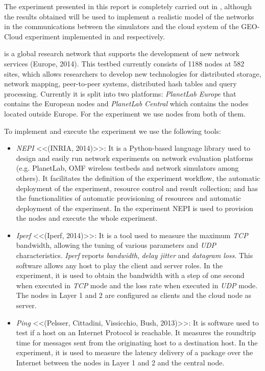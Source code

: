 The experiment presented in this report is completely carried out in \pl, although the results obtained will be used to implement a realistic model of the networks in the communications between the simulators and the cloud system of the GEO-Cloud experiment implemented in \vw and \bonfire respectively. 

\pl is a global research network that supports the development of new network
services (Europe, 2014). This testbed currently consists of 1188 nodes at 582
sites, which allows researchers to develop new technologies for distributed
storage, network mapping, peer-to-peer systems, distributed hash tables and
query processing. Currently it is split into two platforms: \emph{PlanetLab
  Europe} that contains the European nodes and \emph{PlanetLab Central} which
contains the nodes located outside Europe. 
For the experiment we use nodes from both of them. 

To implement and execute the experiment we use the following tools: 
\begin{itemize}
\item \emph{NEPI} <<(INRIA, 2014)>>: It is a Python-based language library used to design and easily run network experiments on network evaluation platforms (e.g. PlanetLab, OMF wireless testbeds and network simulators among others). It facilitates the definition of the experiment workflow, the automatic deployment of the experiment, resource control and result collection; and has the functionalities of automatic provisioning of resources and automatic deployment of the experiment. In the experiment NEPI is used to provision the nodes and execute the whole experiment. 
\item \emph{Iperf} <<(Iperf, 2014)>>: It is a tool used to measure the maximum \emph{TCP} bandwidth, allowing the tuning of various parameters and \emph{UDP} characteristics. \emph{Iperf} reports \emph{bandwidth}, \emph{delay jitter} and \emph{datagram loss}. This software allows any host to play the client and server roles. In the experiment, it is used to obtain the bandwidth with a step of one second when executed in \emph{TCP} mode and the loss rate when executed in \emph{UDP} mode. The nodes in Layer 1 and 2 are configured as clients and the cloud node as server. 
\item \emph{Ping} <<(Pelsser, Cittadini, Vissicchio, Bush, 2013)>>: It is software used to test if a host on an Internet Protocol is reachable. It measures the roundtrip time for messages sent from the originating host to a destination host. In the experiment, it is used to measure the latency delivery of a package over the Internet between the nodes in Layer 1 and 2 and the central node.
\end{itemize}

